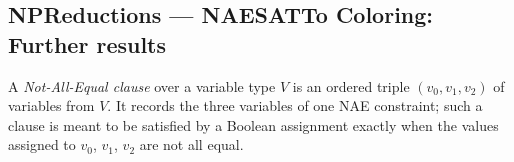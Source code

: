 \subsection*{NPReductions --- NAESATTo Coloring: Further results}

\begin{definition}
\label{NAEtoColor.NAEclause}
\leanok
A \emph{Not-All-Equal clause} over a variable type $V$ is an ordered triple
$(v_0, v_1, v_2)$ of variables from $V$. It records the three variables of one
NAE constraint; such a clause is meant to be satisfied by a Boolean assignment
exactly when the values assigned to $v_0$, $v_1$, $v_2$ are not all equal.
\end{definition}
